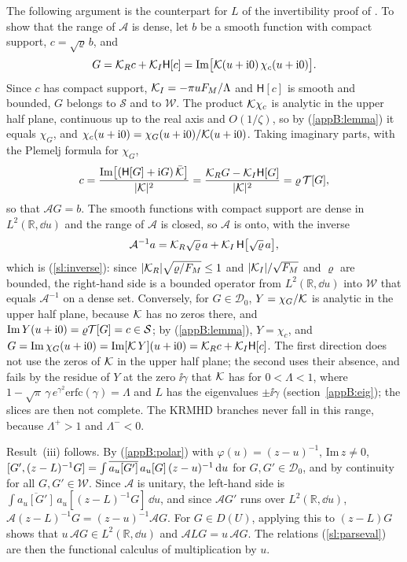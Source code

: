 The following argument is the counterpart for $L$ of the invertibility proof of \citet{Morrison2000}. To show that the range of $\mathcal A$ is dense, let $b$ be a smooth function with compact support, $c=\sqrt\varrho\,b$, and
\begin{equation*}
  G=\mathcal K_Rc+\mathcal K_I\mathsf H[c]=\mathrm{Im}\big[\mathcal K(u+\mathrm{i}0)\,\chi_c(u+\mathrm{i}0)\big].
\end{equation*}
Since $c$ has compact support, $\mathcal K_I=-\pi uF_M/\Lambda$ and $\mathsf H[c]$ is smooth and bounded, $G$ belongs to $\mathcal S$ and to $\mathcal W$. The product $\mathcal K\chi_c$ is analytic in the upper half plane, continuous up to the real axis and $O(1/\zeta)$, so by (\ref{appB:lemma}) it equals $\chi_G$, and $\chi_c(u+\mathrm{i}0)=\chi_G(u+\mathrm{i}0)/\mathcal K(u+\mathrm{i}0)$. Taking imaginary parts, with the Plemelj formula for $\chi_G$,
\begin{equation*}
  c=\frac{\mathrm{Im}\big[(\mathsf H[G]+\mathrm{i} G)\,\bar{\mathcal K}\big]}{|\mathcal K|^2}=\frac{\mathcal K_RG-\mathcal K_I\mathsf H[G]}{|\mathcal K|^2}=\varrho\,\mathcal T[G],
\end{equation*}
so that $\mathcal AG=b$. The smooth functions with compact support are dense in $L^2(\mathbb R,\dd u)$ and the range of $\mathcal A$ is closed, so $\mathcal A$ is onto, with the inverse
\begin{equation}\label{appB:inv}
  \mathcal A^{-1}a=\mathcal K_R\sqrt\varrho\,a+\mathcal K_I\,\mathsf H\big[\sqrt\varrho\,a\big],
\end{equation}
which is (\ref{sl:inverse}): since $|\mathcal K_R|\sqrt{\varrho/F_M}\le1$ and $|\mathcal K_I|/\sqrt{F_M}$ and $\varrho$ are bounded, the right-hand side is a bounded operator from $L^2(\mathbb R,\dd u)$ into $\mathcal W$ that equals $\mathcal A^{-1}$ on a dense set. Conversely, for $G\in\mathcal D_0$, $Y=\chi_G/\mathcal K$ is analytic in the upper half plane, because $\mathcal K$ has no zeros there, and $\mathrm{Im}\,Y(u+\mathrm{i}0)=\varrho\mathcal T[G]=c\in\mathcal S$; by (\ref{appB:lemma}), $Y=\chi_c$, and $G=\mathrm{Im}\,\chi_G(u+\mathrm{i}0)=\mathrm{Im}[\mathcal K\,Y](u+\mathrm{i}0)=\mathcal K_Rc+\mathcal K_I\mathsf H[c]$. The first direction does not use the zeros of $\mathcal K$ in the upper half plane; the second uses their absence, and fails by the residue of $Y$ at the zero $\ii\gamma$ that $\mathcal K$ has for $0<\Lambda<1$, where $1-\sqrt\pi\,\gamma\,e^{\gamma^2}\mathrm{erfc}(\gamma)=\Lambda$ and $L$ has the eigenvalues $\pm\ii\gamma$ (section~\ref{appB:eig}); the slices are then not complete. The KRMHD branches never fall in this range, because $\Lambda^+>1$ and $\Lambda^-<0$.

Result~(iii) follows. By (\ref{appB:polar}) with $\varphi(u)=(z-u)^{-1}$, $\mathrm{Im}\,z\neq0$, $[G',(z-L)^{-1}G]=\int\overline{a_u[G']}\,a_u[G]\,(z-u)^{-1}\,\mathrm{d} u$ for $G,G'\in\mathcal D_0$, and by continuity for all $G,G'\in\mathcal W$. Since $\mathcal A$ is unitary, the left-hand side is $\int\overline{a_u[G']}\,a_u[(z-L)^{-1}G]\,\dd u$, and since $\mathcal AG'$ runs over $L^2(\mathbb R,\dd u)$, $\mathcal A(z-L)^{-1}G=(z-u)^{-1}\mathcal AG$. For $G\in D(U)$, applying this to $(z-L)G$ shows that $u\,\mathcal AG\in L^2(\mathbb R,\dd u)$ and $\mathcal ALG=u\,\mathcal AG$. The relations (\ref{sl:parseval}) are then the functional calculus of multiplication by $u$.

